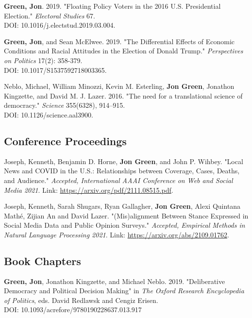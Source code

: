 \documentclass[letterpaper]{article}
\renewenvironment{itemize}{
  \begin{list}{}{
    \setlength{\leftmargin}{1.5em}
  }
}{
  \end{list}
}
\begin{document}
\begin{itemize}
\item \textbf{Green, Jon}. 2019. "Floating Policy Voters in the 2016 U.S. Presidential Election." \textit{Electoral Studies} 67. \\
DOI: 10.1016/j.electstud.2019.03.004.

\item \textbf{Green, Jon}, and Sean McElwee. 2019. "The Differential Effects of Economic Conditions and Racial Attitudes in the Election of Donald Trump." \textit{Perspectives on Politics} 17(2): 358-379. \\
DOI: 10.1017/S1537592718003365.

\item Neblo, Michael, William Minozzi, Kevin M. Esterling, \textbf{Jon Green}, Jonathon Kingzette, and David M. J. Lazer. 2016. "The need for a translational science of democracy." \textit{Science} 355(6328), 914--915.\\
DOI: 10.1126/science.aal3900.
\end{itemize}

\subsection*{Conference Proceedings}

\begin{itemize}
\item Joseph, Kenneth, Benjamin D. Horne, \textbf{Jon Green}, and John P. Wihbey. "Local News and COVID in the U.S.: Relationships between Coverage, Cases, Deaths, and Audience." \textit{Accepted, International AAAI Conference on Web and Social Media 2021}. Link: \url{https://arxiv.org/pdf/2111.08515.pdf}.

\item Joseph, Kenneth, Sarah Shugars, Ryan Gallagher, \textbf{Jon Green}, Alexi Quintana Mathé, Zijian An and David Lazer. "(Mis)alignment Between Stance Expressed in Social Media Data and Public Opinion Surveys." \textit{Accepted, Empirical Methods in Natural Language Processing 2021}. Link: \url{https://arxiv.org/abs/2109.01762}.
\end{itemize}

\subsection*{Book Chapters}

\begin{itemize}
\item \textbf{Green, Jon}, Jonathon Kingzette, and Michael Neblo. 2019. "Deliberative Democracy and Political Decision Making" in \textit{The Oxford Research Encyclopedia of Politics}, eds. David Redlawsk and Cengiz Erisen.\\
DOI: 10.1093/acrefore/9780190228637.013.917
\end{itemize}
\end{document}
